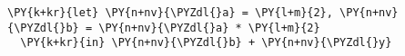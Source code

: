 \begin{Verbatim}[commandchars=\\\{\}]
\PY{k+kr}{let} \PY{n+nv}{\PYZdl{}a} = \PY{l+m}{2}, \PY{n+nv}{\PYZdl{}b} = \PY{n+nv}{\PYZdl{}a} * \PY{l+m}{2}
  \PY{k+kr}{in} \PY{n+nv}{\PYZdl{}b} + \PY{n+nv}{\PYZdl{}y}
\end{Verbatim}

